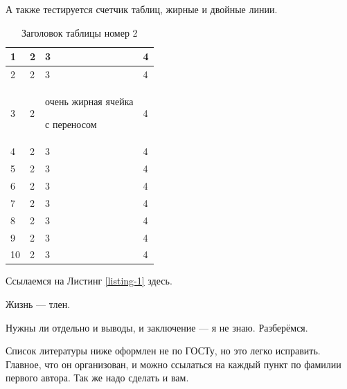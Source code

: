 \documentclass[a4paper,14pt]{extarticle}
\begin{document}
А также тестируется счетчик таблиц, жирные и двойные линии.

\begin{center}
    \begin{longtable}{|p{2cm}||p{3cm}|p{7cm}|p{3cm}|}
    \caption{Заголовок таблицы номер 2}\\
    \hline
    1 & 2 & 3 & 4\\ 
    \hline
    2 & 2 & 3 & 4\\
    \hline
    3 & 2 & очень жирная ячейка \par с переносом & 4\\
    \hline
    4 & 2 & 3 & 4\\
    \hline
    5 & 2 & 3 & 4\\
    \hline
    6 & 2 & 3 & 4\\
    \hline
    7 & 2 & 3 & 4\\
    \hline
    8 & 2 & 3 & 4\\
    \hline
    9 & 2 & 3 & 4\\
    \hline
    10 & 2 & 3 & 4\\
    \hline
    
    
    \end{longtable}
\end{center}

Ссылаемся на Листинг \ref{listing-1} здесь.

\pagebreak
{}
Жизнь --- тлен.

Нужны ли отдельно и выводы, и заключение --- я не знаю. Разберёмся.

Список литературы ниже оформлен не по ГОСТу, но это легко исправить. Главное, что он организован, и можно ссылаться на каждый пункт по фамилии первого автора. Так же надо сделать и вам.
\end{document}
